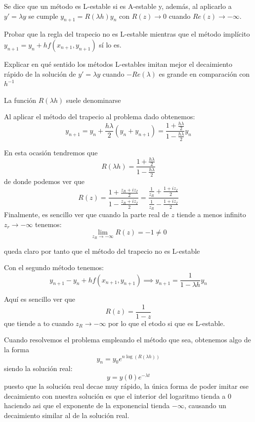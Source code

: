 \begin{problem}[7]
Se dice que un método es L-estable si es A-estable y, además, al aplicarlo a $y'=λy$ se cumple $y_{n+1}=R(λh)y_n$ con $R(z)\to 0$ cuando $Re(z) \to -\infty$.

\ppart Probar que la regla del trapecio no es L-estable mientras que el método implícito $y_{n+1}=y_n+hf(x_{n+1},y_{n+1})$ sí lo es.

\ppart Explicar en qué sentido los métodos L-estables imitan mejor el decaimiento rápido de la solución de $y'=λy$ cuando $-Re(λ)$ es grande en comparación con $h^{-1}$
\solution

La función $R(λh)$ suele denominarse 

\spart


Al aplicar el método del trapecio al problema dado obtenemos:
\[y_{n+1} = y_n + \frac{hλ}{2}(y_n+y_{n+1}) = \frac{1+\frac{hλ}{2}}{1-\frac{hλ}{2}}y_n\]

En esta ocasión tendremos que
\[R(λh) = \frac{1+\frac{hλ}{2}}{1-\frac{hλ}{2}}\]
de donde podemos ver que
\[R(z) = \frac{1+\frac{z_R+iz_I}{2}}{1-\frac{z_R+iz_I}{2}} = \frac{\frac{1}{z_R}+\frac{1+iz_I}{2}}{\frac{1}{z_R}-\frac{1+iz_I}{2}}\]
Finalmente, es sencillo ver que cuando la parte real de $z$ tiende a menos infinito $z_r \to - \infty$ tenemos:
\[\lim_{z_R\to -\infty}R(z) = -1 \neq 0\]

queda claro por tanto que el método del trapecio no es L-estable

Con el segundo método tenemos:
\[y_{n+1} - y_n+hf(x_{n+1},y_{n+1}) \implies y_{n+1} = \frac{1}{1-λh}y_n\]

Aquí es sencillo ver que
\[R(z) = \frac{1}{1-z} \]
que tiende a to cuando $z_R \to -\infty$ por lo que el etodo si que es L-estable.

\spart

Cuando resolvemos el problema empleando el método que sea, obtenemos algo de la forma
\[y_n = y_0e^{n\log(R(λh))}\]
siendo la solución real:
\[y=y(0)e^{-λt}\]
puesto que la solución real decae muy rápido, la única forma de poder imitar ese decaimiento con nuestra solución es que el interior del logaritmo tienda a 0 haciendo asi que el exponente de la exponencial tienda $-\infty$, causando un decaimiento similar al de la solución real.
\end{problem}